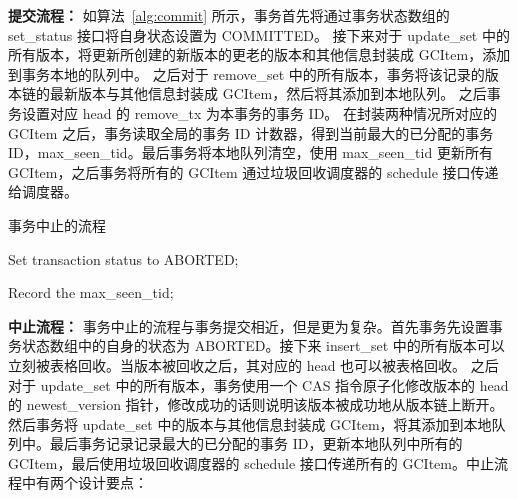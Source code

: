 \textbf{提交流程：} 如算法~\ref{alg:commit} 所示，事务首先将通过事务状态数组的 set\_status 接口将自身状态设置为 COMMITTED。
接下来对于 update\_set 中的所有版本，将更新所创建的新版本的更老的版本和其他信息封装成 GCItem，添加到事务本地的队列中。
之后对于 remove\_set 中的所有版本，事务将该记录的版本链的最新版本与其他信息封装成 GCItem，然后将其添加到本地队列。
之后事务设置对应 head 的 remove\_tx 为本事务的事务 ID。
在封装两种情况所对应的 GCItem 之后，事务读取全局的事务 ID 计数器，得到当前最大的已分配的事务 ID，max\_seen\_tid。最后事务将本地队列清空，使用 max\_seen\_tid 更新所有 GCItem，之后事务将所有的 GCItem 通过垃圾回收调度器的 schedule 接口传递给调度器。


\begin{algorithm}[h]
    \caption{事务中止的流程}
    \label{alg:abort}
    \BlankLine
    Set transaction status to ABORTED;



    Record the max\_seen\_tid;



\end{algorithm}

\textbf{中止流程：} 事务中止的流程与事务提交相近，但是更为复杂。首先事务先设置事务状态数组中的自身的状态为 ABORTED。接下来 insert\_set 中的所有版本可以立刻被表格回收。当版本被回收之后，其对应的 head 也可以被表格回收。
之后对于 update\_set 中的所有版本，事务使用一个 CAS 指令原子化修改版本的 head 的 newest\_version 指针，修改成功的话则说明该版本被成功地从版本链上断开。然后事务将 update\_set 中的版本与其他信息封装成 GCItem，将其添加到本地队列中。最后事务记录记录最大的已分配的事务 ID，更新本地队列中所有的 GCItem，最后使用垃圾回收调度器的 schedule 接口传递所有的 GCItem。中止流程中有两个设计要点：

